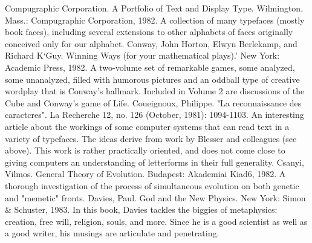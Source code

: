 Compugraphic Corporation. A Portfolio of Text and Display Type. Wilmington, Mass.:
  Compugraphic Corporation, 1982. A collection of many typefaces (mostly book faces),
  including several extensions to other alphabets of faces originally conceived only for our
  alphabet.
Conway, John Horton, Elwyn Berlekamp, and Richard K`Guy. Winning Ways (for your
  mathematical plays).' New York: Academic Press, 1982. A two-volume set of remarkable
  games, some analyzed, some unanalyzed, filled with humorous pictures and an oddball type
  of creative wordplay that is Conway's hallmark. Included in Volume 2 are discussions of the
  Cube and Conway's game of Life.
Coueignoux, Philippe. "La reconnaissance des caractcres". La Recherche 12, no. 126
  (October, 1981): 1094-1103. An interesting article about the workings of some computer
  systems that can read text in a variety of typefaces. The ideas derive from work by Blesser
  and colleagues (see above). This work is rather practically oriented, and does not come
  close to giving computers an understanding of letterforms in their full generality.
Csanyi, Vilmos. General Theory of Evolution. Budapest: Akademiai Kiad6, 1982. A thorough
  investigation of the process of simultaneous evolution on both genetic and "memetic"
  fronts.
Davies, Paul. God and the New Physics. New York: Simon \& Schuster, 1983. In this book,
  Davies tackles the biggies of metaphysics: creation, free will, religion, souls, and more.
  Since he is a good scientist as well as a good writer, his musings are articulate and
  penetrating.


